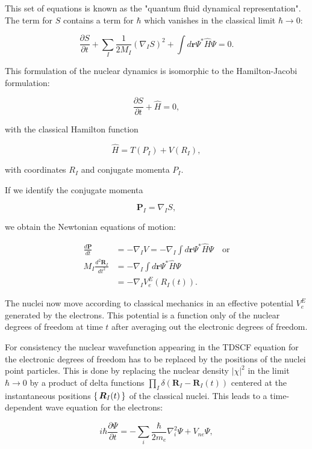 This set of equations is known as the "quantum fluid dynamical representation".
The term for $S$ contains a term for $\hbar$ which vanishes in
the classical limit $\hbar \rightarrow 0$:

$$ \frac{\partial S}{\partial t} + \sum_I \frac{1}{2M_I}
    (\nabla_I S)^2 + \int d\bm{r} \Psi^* \hat{H} \Psi = 0 . $$

This formulation of the nuclear dynamics is isomorphic
to the Hamilton-Jacobi formulation:

$$ \frac{\partial S}{\partial t} + \hat{H} = 0 , $$

with the classical Hamilton function

$$ \hat{H} = T(P_I) + V(R_I) , $$

with coordinates $R_I$ and conjugate momenta $P_I$.
\par
If we identify the conjugate momenta

$$ \bm{P}_I = \nabla_I S , $$

we obtain the Newtonian equations of motion:

\begin{equation}
    \begin{split}
        \frac{d\bm{P}}{dt}
    &= -\nabla_I V
    = -\nabla_I \int d\bm{r} \Psi^* \hat{H} \Psi \quad \text{or} \\
        M_I\frac{d^2 \bm{R}_I}{dt^2}
    &= -\nabla_I \int d\bm{r} \Psi^* \hat{H} \Psi \\
    &= -\nabla_I V_e^E (R_I(t)) .
    \end{split}
\end{equation}

The nuclei now move according to classical mechanics
in an effective potential $V_e^E$ generated by the electrons.
This potential is a function only of the nuclear
degrees of freedom at time $t$ after averaging out
the electronic degrees of freedom.
\par
For consistency the nuclear wavefunction appearing
in the TDSCF equation for the electronic
degrees of freedom has to be replaced by the positions
of the nuclei point particles.
This is done by replacing the nuclear density $\left| \chi \right|^2$
in the limit $\hbar \rightarrow 0$ by a product of delta functions
$ \prod_I \delta (\bm{R}_I - \bm{R}_I(t)) $ centered
at the instantaneous positions $\set{\bm{R}_I(t)}$
of the classical nuclei.
This leads to a time-dependent wave equation
for the electrons:

$$ i\hbar\frac{\partial \Psi}{\partial t} =
    -\sum_i \frac{\hbar}{2m_e} \nabla_i^2 \Psi
    + V_{ne} \Psi , $$

